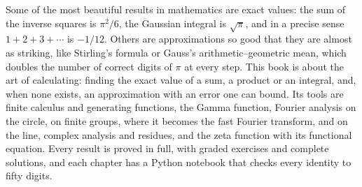 Some of the most beautiful results in mathematics are exact values: the sum of the inverse squares is $\pi^2/6$, the
Gaussian integral is $\sqrt\pi$, and in a precise sense $1+2+3+\cdots$ is $-1/12$. Others are approximations so good that
they are almost as striking, like Stirling's formula or Gauss's arithmetic--geometric mean, which doubles the number of
correct digits of $\pi$ at every step. This book is about the art of calculating: finding the exact value of a sum, a
product or an integral, and, when none exists, an approximation with an error one can bound. Its tools are finite
calculus and generating functions, the Gamma function, Fourier analysis on the circle, on finite groups, where it
becomes the fast Fourier transform, and on the line, complex analysis and residues, and the zeta function with its
functional equation. Every result is proved in full, with graded exercises and complete solutions, and each chapter
has a Python notebook that checks every identity to fifty digits.
